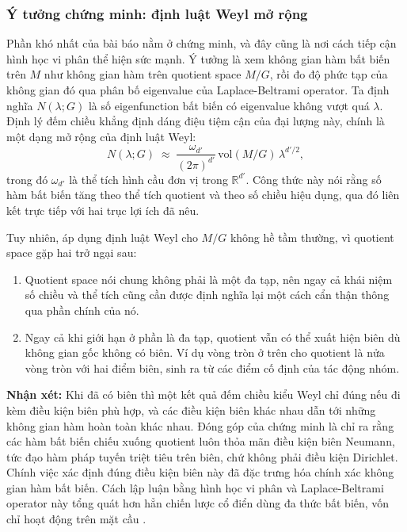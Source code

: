 \subsubsection{Ý tưởng chứng minh: định luật Weyl mở rộng}
 
Phần khó nhất của bài báo nằm ở chứng minh, và đây cũng là nơi cách tiếp cận hình học vi phân thể hiện sức mạnh. Ý tưởng là xem không gian hàm bất biến trên $M$ như không gian hàm trên quotient space $M/G$, rồi đo độ phức tạp của không gian đó qua phân bố eigenvalue của Laplace-Beltrami operator. Ta định nghĩa $N(\lambda; G)$ là số eigenfunction bất biến có eigenvalue không vượt quá $\lambda$. Định lý đếm chiều khẳng định dáng điệu tiệm cận của đại lượng này, chính là một dạng mở rộng của định luật Weyl:
\begin{equation}
    N(\lambda; G) \;\approx\; \frac{\omega_{d'}}{(2\pi)^{d'}} \, \mathrm{vol}(M/G)\, \lambda^{d'/2},
\end{equation}
trong đó $\omega_{d'}$ là thể tích hình cầu đơn vị trong $\mathbb{R}^{d'}$. Công thức này nói rằng số hàm bất biến tăng theo thể tích quotient và theo số chiều hiệu dụng, qua đó liên kết trực tiếp với hai trục lợi ích đã nêu.
 
Tuy nhiên, áp dụng định luật Weyl cho $M/G$ không hề tầm thường, vì quotient space gặp hai trở ngại sau:
\begin{enumerate}
    \item Quotient space nói chung không phải là một đa tạp, nên ngay cả khái niệm số chiều và thể tích cũng cần được định nghĩa lại một cách cẩn thận thông qua phần chính của nó.
    \item Ngay cả khi giới hạn ở phần là đa tạp, quotient vẫn có thể xuất hiện biên dù không gian gốc không có biên. Ví dụ vòng tròn ở trên cho quotient là nửa vòng tròn với hai điểm biên, sinh ra từ các điểm cố định của tác động nhóm.
\end{enumerate}
 
\textbf{Nhận xét:} Khi đã có biên thì một kết quả đếm chiều kiểu Weyl chỉ đúng nếu đi kèm điều kiện biên phù hợp, và các điều kiện biên khác nhau dẫn tới những không gian hàm hoàn toàn khác nhau. Đóng góp của chứng minh là chỉ ra rằng các hàm bất biến chiếu xuống quotient luôn thỏa mãn điều kiện biên Neumann, tức đạo hàm pháp tuyến triệt tiêu trên biên, chứ không phải điều kiện Dirichlet. Chính việc xác định đúng điều kiện biên này đã đặc trưng hóa chính xác không gian hàm bất biến. Cách lập luận bằng hình học vi phân và Laplace-Beltrami operator này tổng quát hơn hẳn chiến lược cổ điển dùng đa thức bất biến, vốn chỉ hoạt động trên mặt cầu \cite{bietti2021sample}.
 

